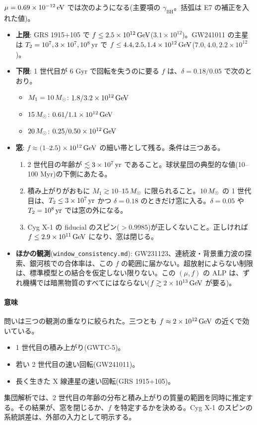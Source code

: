\begin{result}
$\mu=0.69\times10^{-12}\,\mathrm{eV}$ では次のようになる(主要項の $\gamma_\mathrm{BH}$。括弧は E7 の補正を入れた値)。
\begin{itemize}
\item \textbf{上限}: GRS 1915+105 で $f\le2.5\times10^{12}\,\mathrm{GeV}$($3.1\times10^{12}$)。GW241011 の主星は $T_2=10^7,3\times10^7,10^8\,\mathrm{yr}$ で $f\le4.4,2.5,1.4\times10^{12}\,\mathrm{GeV}$($7.0,4.0,2.2\times10^{12}$)。
\item \textbf{下限}: 1 世代目が 6 Gyr で回転を失うのに要る $f$ は、$\delta=0.18/0.05$ で次のとおり。
  \begin{itemize}
  \item $M_1=10\,M_\odot$: $1.8/3.2\times10^{12}\,\mathrm{GeV}$
  \item $15\,M_\odot$: $0.61/1.1\times10^{12}\,\mathrm{GeV}$
  \item $20\,M_\odot$: $0.25/0.50\times10^{12}\,\mathrm{GeV}$
  \end{itemize}
\item \textbf{窓}: $f\approx(1$--$2.5)\times10^{12}\,\mathrm{GeV}$ の細い帯として残る。条件は三つある。
  \begin{enumerate}
  \item 2 世代目の年齢が $\lesssim3\times10^7\,\mathrm{yr}$ であること。球状星団の典型的な値(10--100 Myr)の下側にあたる。
  \item 積み上がりがおもに $M_1\gtrsim10$--$15\,M_\odot$ に限られること。$10\,M_\odot$ の 1 世代目は、$T_2\le3\times10^7\,\mathrm{yr}$ かつ $\delta=0.18$ のときだけ窓に入る。$\delta=0.05$ や $T_2=10^8\,\mathrm{yr}$ では窓の外になる。
  \item Cyg X-1 の fiducial のスピン($>0.9985$)が正しくないこと。正しければ $f\le2.9\times10^{11}\,\mathrm{GeV}$ になり、窓は閉じる。
  \end{enumerate}
\item \textbf{ほかの観測}(\texttt{window\_consistency.md}): GW231123、連続波・背景重力波の探索、銀河核での合体率は、この $f$ の範囲に届かない。超放射によらない制限は、標準模型との結合を仮定しない限りない。この $(\mu,f)$ の ALP は、ずれ機構では暗黒物質のすべてにはならない($f\gtrsim2\times10^{13}\,\mathrm{GeV}$ が要る)。
\end{itemize}
\end{result}

\paragraph{意味}
問いは三つの観測の重なりに絞られた。三つとも $f\approx2\times10^{12}\,\mathrm{GeV}$ の近くで効いている。
\begin{itemize}
\item 1 世代目の積み上がり(GWTC-5)。
\item 若い 2 世代目の速い回転(GW241011)。
\item 長く生きた X 線連星の速い回転(GRS 1915+105)。
\end{itemize}
集団解析では、2 世代目の年齢の分布と積み上がりの質量の範囲を同時に推定する。その結果が、窓を閉じるか、$f$ を特定するかを決める。Cyg X-1 のスピンの系統誤差は、外部の入力として明示する。

